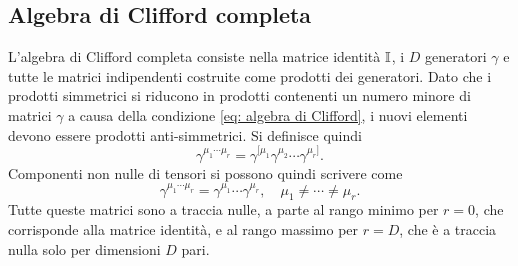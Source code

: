 
\subsection{Algebra di Clifford completa}
L'algebra di Clifford completa consiste nella matrice identità $\mathbb{I}$, i $D$ generatori $\gamma$ e tutte le matrici indipendenti costruite come prodotti dei generatori. Dato che i prodotti simmetrici si riducono in prodotti contenenti un numero minore di matrici $\gamma$ a causa della condizione \eqref{eq: algebra di Clifford}, i nuovi elementi devono essere prodotti anti-simmetrici. Si definisce quindi 
\begin{equation}
\label{eq: anti-simmetrizzazione prodotti matrici gamma}
    \gamma^{\mu_1\cdots\mu_r} = \gamma^{[\mu_1}\gamma^{\mu_2}\cdots\gamma^{\mu_r]}.
\end{equation}
Componenti non nulle di tensori si possono quindi scrivere come 
\begin{equation}
    \gamma^{\mu_1\cdots\mu_r} = \gamma^{\mu_1}\cdots\gamma^{\mu_r},\quad \mu_1 \neq \cdots \neq \mu_r.
\end{equation}
Tutte queste matrici sono a traccia nulle, a parte al rango minimo per $r = 0$, che corrisponde alla matrice identità, e al rango massimo per $r = D$, che è a traccia nulla solo per dimensioni $D$ pari. 

